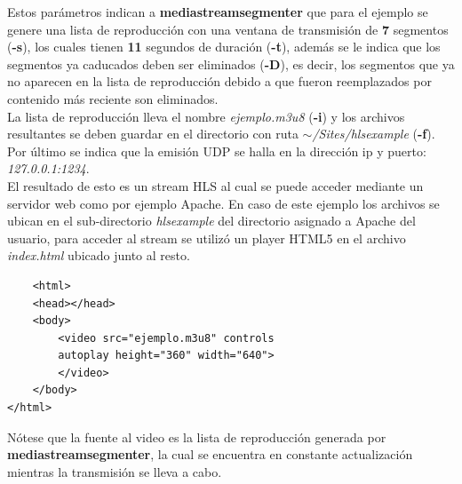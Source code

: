 Estos parámetros indican a \textbf{mediastreamsegmenter} que para el ejemplo se genere una lista de reproducción con una ventana de transmisión de \textbf{7} segmentos (\textbf{-s}), los cuales tienen \textbf{11} segundos de duración (\textbf{-t}), además se le indica que los segmentos ya caducados deben ser eliminados (\textbf{-D}), es decir, los segmentos que ya no aparecen en la lista de reproducción debido a que fueron reemplazados por contenido más reciente son eliminados. \\

La lista de reproducción lleva el nombre \textit{ejemplo.m3u8} (\textbf{-i}) y los archivos resultantes se deben guardar en el directorio con ruta \textit{$\sim$/Sites/hlsexample} (\textbf{-f}). Por último se indica que la emisión UDP se halla en la dirección ip y puerto: \textit{127.0.0.1:1234}.\\

El resultado de esto es un stream HLS al cual se puede acceder mediante un servidor web como por ejemplo Apache. En caso de este ejemplo los archivos se ubican en el sub-directorio \textit{hlsexample} del directorio asignado a Apache del usuario, para acceder al stream se utilizó un player HTML5 en el archivo \textit{index.html} ubicado junto al resto.

 \begin{lstlisting}
	<html>
	<head></head>
	<body>
		<video src="ejemplo.m3u8" controls 
		autoplay height="360" width="640">
		</video>
	</body>
</html>\end{lstlisting}

Nótese que la fuente al video es la lista de reproducción generada por \textbf{mediastreamsegmenter}, la cual se encuentra en constante actualización mientras la transmisión se lleva a cabo.\\

